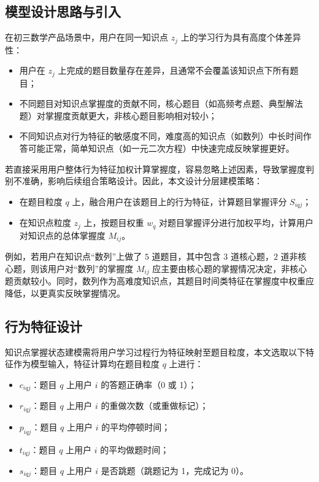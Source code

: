 \subsection{模型设计思路与引入}

在初三数学产品场景中，用户在同一知识点 $z_j$ 上的学习行为具有高度个体差异性：

\begin{itemize}
\item 用户在 $z_j$ 上完成的题目数量存在差异，且通常不会覆盖该知识点下所有题目；
\item 不同题目对知识点掌握度的贡献不同，核心题目（如高频考点题、典型解法题）对掌握度贡献更大，非核心题目影响相对较小；
\item 不同知识点对行为特征的敏感度不同，难度高的知识点（如数列）中长时间作答可能正常，简单知识点（如一元二次方程）中快速完成反映掌握更好。
\end{itemize}

若直接采用用户整体行为特征加权计算掌握度，容易忽略上述因素，导致掌握度判别不准确，影响后续组合策略设计。因此，本文设计分层建模策略：

\begin{itemize}
\item 在题目粒度 $q$ 上，融合用户在该题目上的行为特征，计算题目掌握评分 $S_{iqj}$；
\item 在知识点粒度 $z_j$ 上，按题目权重 $w_q$ 对题目掌握评分进行加权平均，计算用户对知识点的总体掌握度 $M_{ij}$。
\end{itemize}

例如，若用户在知识点“数列”上做了 $5$ 道题目，其中包含 $3$ 道核心题，$2$ 道非核心题，则该用户对“数列”的掌握度 $M_{ij}$ 应主要由核心题的掌握情况决定，非核心题贡献较小。同时，数列作为高难度知识点，其题目时间类特征在掌握度中权重应降低，以更真实反映掌握情况。

\subsection{行为特征设计}

知识点掌握状态建模需将用户学习过程行为特征映射至题目粒度，本文选取以下特征作为模型输入，特征计算均在题目粒度 $q$ 上进行：

\begin{itemize}
\item $c_{iqj}$：题目 $q$ 上用户 $i$ 的答题正确率（0 或 1）；
\item $r_{iqj}$：题目 $q$ 上用户 $i$ 的重做次数（或重做标记）；
\item $p_{iqj}$：题目 $q$ 上用户 $i$ 的平均停顿时间；
\item $t_{iqj}$：题目 $q$ 上用户 $i$ 的平均做题时间；
\item $s_{iqj}$：题目 $q$ 上用户 $i$ 是否跳题（跳题记为 1，完成记为 0）。
\end{itemize}

